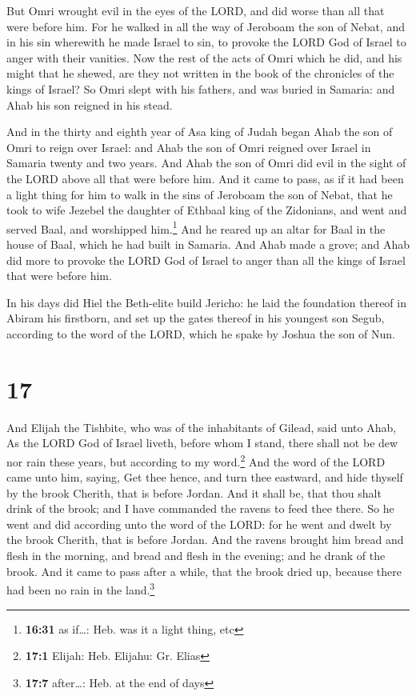  But Omri wrought evil in the eyes of the LORD, and did
worse than all that were before him.  For he walked in
all the way of Jeroboam the son of Nebat, and in his sin wherewith he
made Israel to sin, to provoke the LORD God of Israel to anger with
their vanities.  Now the rest of the acts of Omri which
he did, and his might that he shewed, are they not written in the book
of the chronicles of the kings of Israel?  So Omri slept
with his fathers, and was buried in Samaria: and Ahab his son reigned in
his stead.

 And in the thirty and eighth year of Asa king of Judah
began Ahab the son of Omri to reign over Israel: and Ahab the son of
Omri reigned over Israel in Samaria twenty and two years.
 And Ahab the son of Omri did evil in the sight of the
LORD above all that were before him.  And it came to
pass, as if it had been a light thing for him to walk in the sins of
Jeroboam the son of Nebat, that he took to wife Jezebel the daughter of
Ethbaal king of the Zidonians, and went and served Baal, and worshipped
him.\footnote{\textbf{16:31} as if\ldots: Heb. was it a light thing, etc}
 And he reared up an altar for Baal in the house of Baal,
which he had built in Samaria.  And Ahab made a grove;
and Ahab did more to provoke the LORD God of Israel to anger than all
the kings of Israel that were before him.

 In his days did Hiel the Beth-elite build Jericho: he
laid the foundation thereof in Abiram his firstborn, and set up the
gates thereof in his youngest son Segub, according to the word of the
LORD, which he spake by Joshua the son of Nun.

\hypertarget{section-16}{%
\section{17}\label{section-16}}

 And Elijah the Tishbite, who was of the inhabitants of
Gilead, said unto Ahab, As the LORD God of Israel liveth, before whom I
stand, there shall not be dew nor rain these years, but according to my
word.\footnote{\textbf{17:1} Elijah: Heb. Elijahu: Gr. Elias}
 And the word of the LORD came unto him, saying,
 Get thee hence, and turn thee eastward, and hide thyself
by the brook Cherith, that is before Jordan.  And it shall
be, that thou shalt drink of the brook; and I have commanded the ravens
to feed thee there.  So he went and did according unto the
word of the LORD: for he went and dwelt by the brook Cherith, that is
before Jordan.  And the ravens brought him bread and flesh
in the morning, and bread and flesh in the evening; and he drank of the
brook.  And it came to pass after a while, that the brook
dried up, because there had been no rain in the land.\footnote{\textbf{17:7}
  after\ldots: Heb. at the end of days}

